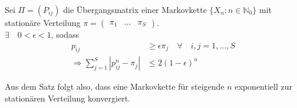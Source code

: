 \documentclass[a4paper,12pt]{article}
\begin{document}
\begin{tcolorbox}[breakable, colframe=green, colback=white, title=Satz 14]
Sei $\Pi = (P_{ij})$ die Übergangsmatrix einer Markovkette $\{X_n: n \in \mathbb{N}_0\}$
mit stationäre Verteilung $\pi = \begin{pmatrix}\pi_1 & ... & \pi_S \end{pmatrix}$.\\
$\exists \quad 0 < \epsilon < 1$, sodass
\begin{align*}
p_{ij} &\geq \epsilon \pi_j \quad \forall \quad i,j=1, ..., S\\
\Rightarrow \sum_{j=1}^{S}|p_{ij}^n - \pi_j| &\leq 2(1-\epsilon)^n
\end{align*}
\end{tcolorbox}
Aus dem Satz folgt also, dass eine Markovkette für steigende $n$ exponentiell zur stationären Verteilung konvergiert.\\
\end{document}
